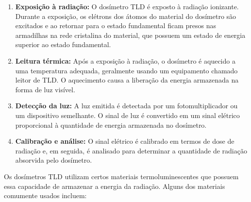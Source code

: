 \documentclass[11pt,a4paper]{article}
\begin{document}
		\begin{enumerate}
			\item \textbf{Exposição à radiação:} O dosímetro TLD é exposto à radiação ionizante. Durante a exposição, os elétrons dos átomos do material do dosímetro são excitados e ao retornar para o estado fundamental ficam presos nas armadilhas na rede cristalina do material, que possuem um estado de energia superior ao estado fundamental.
			\item \textbf{Leitura térmica:} Após a exposição à radiação, o dosímetro é aquecido a uma temperatura adequada, geralmente usando um equipamento chamado leitor de TLD. O aquecimento causa a liberação da energia armazenada na forma de luz visível.
			\item \textbf{Detecção da luz:} A luz emitida é detectada por um fotomultiplicador ou um dispositivo semelhante. O sinal de luz é convertido em um sinal elétrico proporcional à quantidade de energia armazenada no dosímetro.
			\item \textbf{Calibração e análise:} O sinal elétrico é calibrado em termos de dose de radiação e, em seguida, é analisado para determinar a quantidade de radiação absorvida pelo dosímetro.
		\end{enumerate}
		
		Os dosímetros TLD utilizam certos materiais termoluminescentes que possuem essa capacidade de armazenar a energia da radiação. Alguns dos materiais comumente usados incluem:
\end{document}
